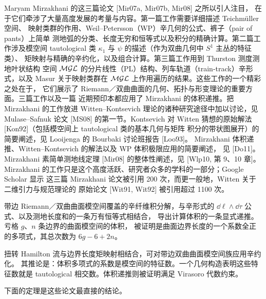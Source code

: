 Maryam Mirzakhani 的这三篇论文 [Mir07a, Mir07b, Mir08] 之所以引人注目，
在于它们牵涉了大量高度发展的考量与内容。第一篇工作需要详细描述 Teichm\"uller 空间、
映射类群的作用、Weil--Petersson（WP）辛几何的公式、裤子（pair of pants）上简单
测地弧的分类、长度无穷和恒等式以及积分的精确计算。第二篇工作涉及模空间
tautological 类 $\kappa_1$ 与 $\psi$ 的描述（作为双曲几何中 $S^1$ 主丛的特征类）、
矩映射与精确的辛约化，以及组合计算。第三篇工作用到 Thurston 测度测地叶状结构
空间 $\mathcal{M}\mathcal{G}\mathcal{L}$ 的分片线性（PL）结构、列车轨道（train-track）辛形式，以及 Masur
关于映射类群在 $\mathcal{M}\mathcal{G}\mathcal{L}$ 上作用遍历的结果。这些工作的一个精彩之处在于，
它们展示了 Riemann／双曲曲面的几何、拓扑与形变理论的重要方面。三篇工作以及一篇
近期预印本都应用了 Mirzakhani 的体积递推。把 Mirzakhani 的工作放进 Witten--Kontsevich
理论的诸种研究途径中加以讨论，见 Mulase--Safnuk 论文 [MS08] 的第一节。Kontsevich
对 Witten 猜想的原始解法 [Kon92]（包括模空间上 tautological 类的基本几何与矩阵
积分的带状图展开）的简要阐述，见 Looijenga 的 Bourbaki 讨论班报告 [Loo93]。
Mirzakhani 体积递推、Witten--Kontsevich 的解法以及 WP 体积极限应用的简要阐述，
见 [Do11]。Mirzakhani 素简单测地线定理 [Mir08] 的整体性阐述，见 [Wlp10, 第 9、10 章]。
Mirzakhani 的工作只是这个高度活跃、研究者众多的学科的一部分；Google Scholar 显示
这三篇 Mirzakhani 论文被引用 200 次，而更一般地，Witten 关于二维引力与规范理论的
原始论文 [Wit91, Wit92] 被引用超过 1100 次。


带边 Riemann／双曲曲面模空间覆盖的辛纤维积分解，与辛形式的
$\dd\ell\wedge\dd\tau$ 公式、以及测地长度和的一条万有恒等式相结合，
导出计算体积的一条显式递推。亏格 $g$、$n$ 条边界的曲面模空间的体积，
被证明是曲面边界长度的一个系数全正的多项式，其总次数为 $6g-6+2n$。

扭转 Hamilton 流与边界长度矩映射相结合，可对带边双曲曲面模空间族应用辛约化。
其推论是：体积多项式的系数是模空间的特征数。一个几何构造表明这些特征数就是
tautological 相交数。体积递推则被证明满足 Virasoro 代数约束。

下面的定理是这些论文最直接的结论。

